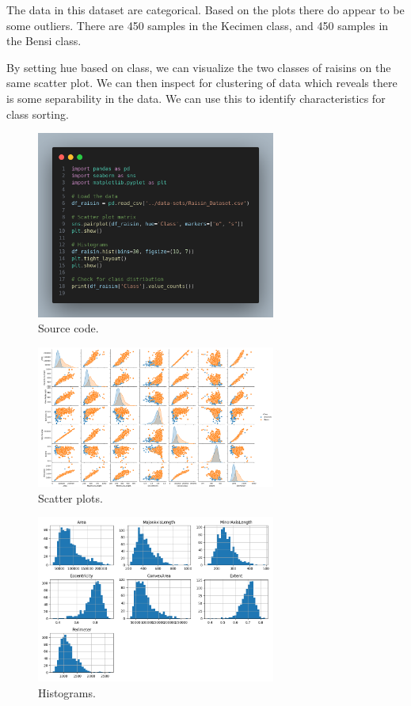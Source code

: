 \documentclass{article}
\begin{document}
		The data in this dataset are categorical. Based on the plots there do appear to be some outliers. There are 450 samples in the Kecimen class, and 450 samples in the Bensi class.

		By setting hue based on class, we can visualize the two classes of raisins on the same scatter plot. We can then inspect for clustering of data which reveals there is some separability in the data. We can use this to identify characteristics for class sorting.

			\begin{figure}[H]
				\centering
				\includegraphics[width=0.7\textwidth]{raisin-code.png}
				\caption{Source code.}
			\end{figure}

			\begin{figure}[H]
				\centering
				\includegraphics[width=0.7\textwidth]{raisin-scatter.png}
				\caption{Scatter plots.}
			\end{figure}
			
			\begin{figure}[H]
				\centering
				\includegraphics[width=0.7\textwidth]{raisin-hist.png}
				\caption{Histograms.}
			\end{figure}
\end{document}
